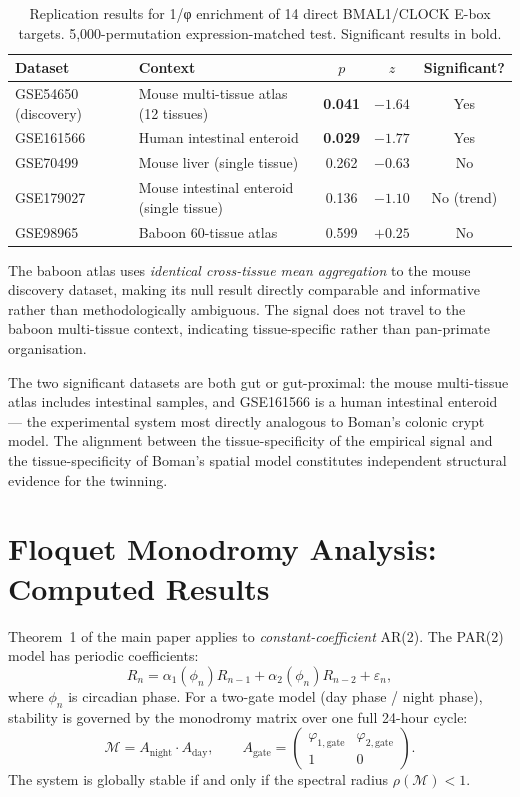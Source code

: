 \documentclass[11pt,letterpaper]{article}
\theoremstyle{definition}
\theoremstyle{remark}
\begin{document}
\begin{table}[H]
\centering
\caption{Replication results for 1/φ enrichment of 14 direct BMAL1/CLOCK E-box targets.
5,000-permutation expression-matched test. Significant results in bold.}
\label{tab:replication}
\begin{tabular}{llccc}
\toprule
Dataset & Context & $p$ & $z$ & Significant? \\
\midrule
GSE54650 (discovery) & Mouse multi-tissue atlas (12 tissues) & \textbf{0.041} & $-1.64$ & Yes \\
GSE161566 & Human intestinal enteroid & \textbf{0.029} & $-1.77$ & Yes \\
GSE70499 & Mouse liver (single tissue) & 0.262 & $-0.63$ & No \\
GSE179027 & Mouse intestinal enteroid (single tissue) & 0.136 & $-1.10$ & No (trend) \\
GSE98965 & Baboon 60-tissue atlas & 0.599 & $+0.25$ & No \\
\bottomrule
\end{tabular}
\end{table}

The baboon atlas uses \emph{identical cross-tissue mean aggregation} to the mouse discovery dataset,
making its null result directly comparable and informative rather than methodologically ambiguous.
The signal does not travel to the baboon multi-tissue context, indicating tissue-specific rather
than pan-primate organisation.

The two significant datasets are both gut or gut-proximal: the mouse multi-tissue atlas includes
intestinal samples, and GSE161566 is a human intestinal enteroid --- the experimental system most
directly analogous to Boman's colonic crypt model. The alignment between the tissue-specificity of
the empirical signal and the tissue-specificity of Boman's spatial model constitutes independent
structural evidence for the twinning.

\section{Floquet Monodromy Analysis: Computed Results}
\label{sec:floquet}

Theorem~1 of the main paper applies to \emph{constant-coefficient} AR(2). The PAR(2) model
has periodic coefficients:
\[
R_n = \alpha_1(\phi_n) R_{n-1} + \alpha_2(\phi_n) R_{n-2} + \varepsilon_n,
\]
where $\phi_n$ is circadian phase. For a two-gate model (day phase / night phase), stability
is governed by the monodromy matrix over one full 24-hour cycle:
\[
\mathcal{M} = A_{\text{night}} \cdot A_{\text{day}}, \qquad
A_{\text{gate}} = \begin{pmatrix} \varphi_{1,\text{gate}} & \varphi_{2,\text{gate}} \\ 1 & 0 \end{pmatrix}.
\]
The system is globally stable if and only if the spectral radius $\rho(\mathcal{M}) < 1$.
\end{document}

